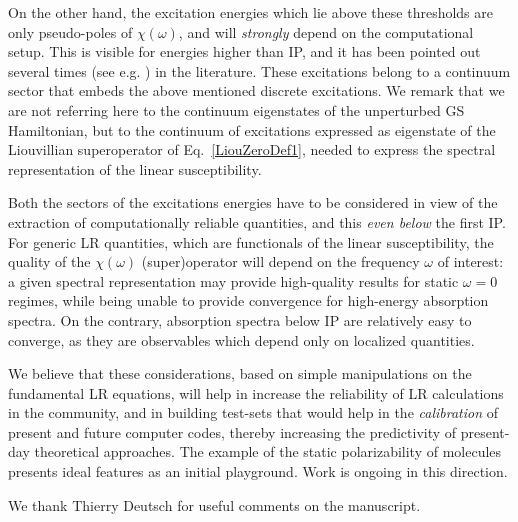 \documentclass[reprint,aps,prb]{revtex4-1}
\begin{document}
On the other hand, the excitation energies which lie above these thresholds are only pseudo-poles of $\chi(\omega)$,
and will \emph{strongly} depend on the computational setup. This is visible for energies higher than
IP, and it has been pointed out several times (see e.g. \cite{giustino2012,giustino2014}) in the literature.
These excitations belong to a continuum sector that embeds the above mentioned discrete excitations.
We remark that we are not referring here to the continuum eigenstates of the
unperturbed GS Hamiltonian,
but to the continuum of excitations expressed as eigenstate of the
Liouvillian superoperator of Eq.~\eqref{LiouZeroDef1}, needed to
express the spectral representation of the linear susceptibility.

Both the sectors of the excitations energies have to be considered in view of the extraction of computationally reliable quantities, and this \emph{even below} the first IP.
For generic LR quantities, which are functionals of the linear susceptibility,
the quality of the $\chi(\omega)$ (super)operator will depend
on the frequency $\omega$ of interest: a given spectral representation may provide high-quality results for static $\omega=0$ regimes, while being
unable to provide convergence for high-energy absorption spectra.
On the contrary, absorption spectra below IP are relatively easy to converge, as they are observables which depend only on localized quantities.

We believe that these considerations, based on simple manipulations on the fundamental LR equations, will help in increase
the reliability of LR calculations in the community, and in building test-sets that would help in
the \emph{calibration} of present and future computer codes, thereby increasing the predictivity of present-day theoretical approaches.
The example of the static polarizability of molecules
presents ideal features as an initial playground. Work is ongoing in this direction.

\begin{acknowledgments}
We thank Thierry Deutsch for useful comments on the manuscript.
\end{acknowledgments}

\appendix
\end{document}
